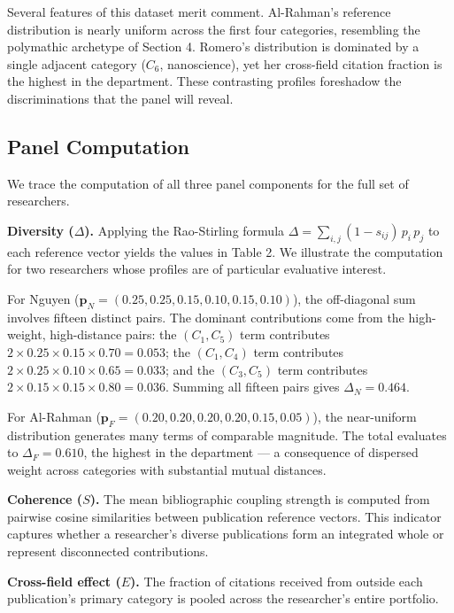 \documentclass[
]{article}
\begin{document}
Several features of this dataset merit comment. Al-Rahman's reference
distribution is nearly uniform across the first four categories,
resembling the polymathic archetype of Section 4. Romero's distribution
is dominated by a single adjacent category (\(C_6\), nanoscience), yet
her cross-field citation fraction is the highest in the department.
These contrasting profiles foreshadow the discriminations that the panel
will reveal.

\hypertarget{panel-computation}{%
\subsection{Panel Computation}\label{panel-computation}}

We trace the computation of all three panel components for the full set
of researchers.

\textbf{Diversity (\(\Delta\)).} Applying the Rao-Stirling formula
\(\Delta = \sum_{i,j} (1 - s_{ij})\, p_i\, p_j\) to each reference
vector yields the values in Table 2. We illustrate the computation for
two researchers whose profiles are of particular evaluative interest.

For Nguyen (\(\mathbf{p}_N = (0.25, 0.25, 0.15, 0.10, 0.15, 0.10)\)),
the off-diagonal sum involves fifteen distinct pairs. The dominant
contributions come from the high-weight, high-distance pairs: the
\((C_1, C_5)\) term contributes
\(2 \times 0.25 \times 0.15 \times 0.70 = 0.053\); the \((C_1, C_4)\)
term contributes \(2 \times 0.25 \times 0.10 \times 0.65 = 0.033\); and
the \((C_3, C_5)\) term contributes
\(2 \times 0.15 \times 0.15 \times 0.80 = 0.036\). Summing all fifteen
pairs gives \(\Delta_N = 0.464\).

For Al-Rahman (\(\mathbf{p}_F = (0.20, 0.20, 0.20, 0.20, 0.15, 0.05)\)),
the near-uniform distribution generates many terms of comparable
magnitude. The total evaluates to \(\Delta_F = 0.610\), the highest in
the department --- a consequence of dispersed weight across categories
with substantial mutual distances.

\textbf{Coherence (\(S\)).} The mean bibliographic coupling strength is
computed from pairwise cosine similarities between publication reference
vectors. This indicator captures whether a researcher's diverse
publications form an integrated whole or represent disconnected
contributions.

\textbf{Cross-field effect (\(E\)).} The fraction of citations received
from outside each publication's primary category is pooled across the
researcher's entire portfolio.
\end{document}

